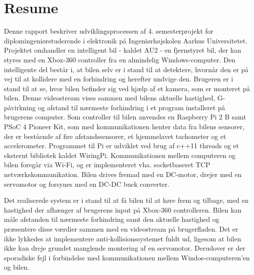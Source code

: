 \chapter{Resume}
\label{ch:Resume}

Denne rapport beskriver udviklingsprocessen af 4. semesterprojekt for diplomingeniørstuderende i elektronik på Ingeniørhøjskolen Aarhus Universitetet. 
Projektet omhandler en intelligent bil - kaldet AU2 - en fjernstyret bil, der kan styres med en Xbox-360 controller\cite{lib:xbox-360} fra en almindelig Windows-computer. 
Den intelligente del består i, at bilen selv er i stand til at detektere, hvornår den er på vej til at kollidere med en forhindring og herefter undvige den. 
Brugeren er i stand til at se, hvor bilen befinder sig ved hjælp af et kamera\cite{lib:cam}, som er monteret på bilen. 
Denne videostream vises sammen med bilens aktuelle hastighed, G-påvirkning og  afstand til nærmeste forhindring i et program installeret på brugerens computer.
Som controller til bilen anvendes en Raspberry Pi 2 B samt PSoC 4 Pioneer Kit\cite{lib:psoc4_guide}, som med \IIC kommunikationen henter data fra bilens sensorer, der er bestående af fire afstandssensorer\cite{lib:maxsonar}, et hjemmelavet tachometer og et accelerometer\cite{lib:accel}. 
Programmet til Pi er udviklet ved brug af c++11 threads og et eksternt \IIC bibliotek kaldet WiringPi\cite{lib:wiringpi}. 
Kommunikationen mellem computeren og bilen foregår via Wi-Fi, og er implementeret vha. socketbaseret TCP netværkskommunikation. 
Bilen drives fremad med en DC-motor, drejer med en servomotor og forsynes med en DC-DC buck converter.

Det realiserede system er i stand til at få bilen til at køre frem og tilbage, med en hastighed der afhænger af brugerens input på Xbox-360 controlleren. Bilen kan måle afstanden til nærmeste forhindring samt den aktuelle hastighed og præsentere disse værdier sammen med en videostream på brugerfladen. Det er ikke lykkedes at implementere anti-kollisionssystemet fuldt ud, ligesom at bilen ikke kan dreje grundet manglende montering af en servomotor. Derudover er der sporadiske fejl i forbindelse med kommunikationen mellem Windos-computeren'en og bilen.
\clearpage